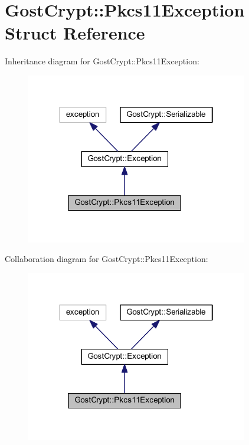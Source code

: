 \hypertarget{struct_gost_crypt_1_1_pkcs11_exception}{}\section{Gost\+Crypt\+:\+:Pkcs11\+Exception Struct Reference}
\label{struct_gost_crypt_1_1_pkcs11_exception}


Inheritance diagram for Gost\+Crypt\+:\+:Pkcs11\+Exception\+:
\nopagebreak
\begin{figure}[H]
\begin{center}
\leavevmode
\includegraphics[width=274pt]{struct_gost_crypt_1_1_pkcs11_exception__inherit__graph}
\end{center}
\end{figure}


Collaboration diagram for Gost\+Crypt\+:\+:Pkcs11\+Exception\+:
\nopagebreak
\begin{figure}[H]
\begin{center}
\leavevmode
\includegraphics[width=274pt]{struct_gost_crypt_1_1_pkcs11_exception__coll__graph}
\end{center}
\end{figure}
